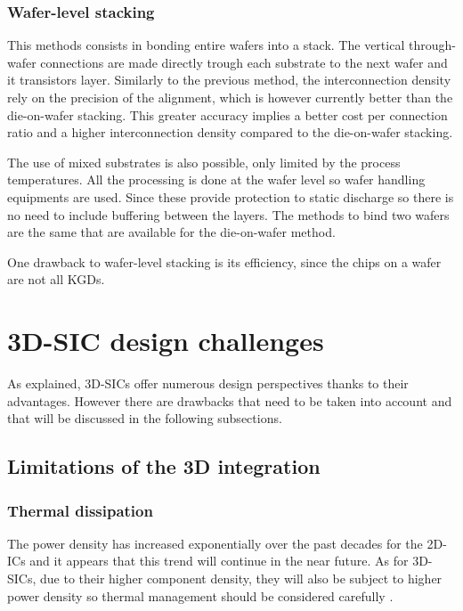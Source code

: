 \subsubsection{Wafer-level stacking}

This methods consists in bonding entire wafers into a stack. The vertical through-wafer connections are made directly trough each substrate to the next wafer and it transistors layer. Similarly to the previous method, the interconnection density rely on the precision of the alignment, which is however currently better than the die-on-wafer stacking. This greater accuracy implies a better cost per connection ratio and a higher interconnection density compared to the die-on-wafer stacking.

The use of mixed substrates is also possible, only limited by the process temperatures. All the processing is done at the wafer level so wafer handling equipments are used. Since these provide protection to static discharge so there is no need to include buffering between the layers. The methods to bind two wafers are the same that are available for the die-on-wafer method.

One drawback to wafer-level stacking is its efficiency, since the chips on a wafer are not all KGDs.

\section{3D-SIC design challenges}

As explained, 3D-SICs offer numerous design perspectives thanks to their advantages. However there are drawbacks that need to be taken into account and that will be discussed in the following subsections.

\subsection{Limitations of the 3D integration}

\subsubsection{Thermal dissipation}
The power density has increased exponentially over the past decades for the 2D-ICs and it appears that this trend will continue in the near future. As for 3D-SICs, due to their higher component density, they will also be subject to higher power density so thermal management should be considered carefully \cite{659500}. 

